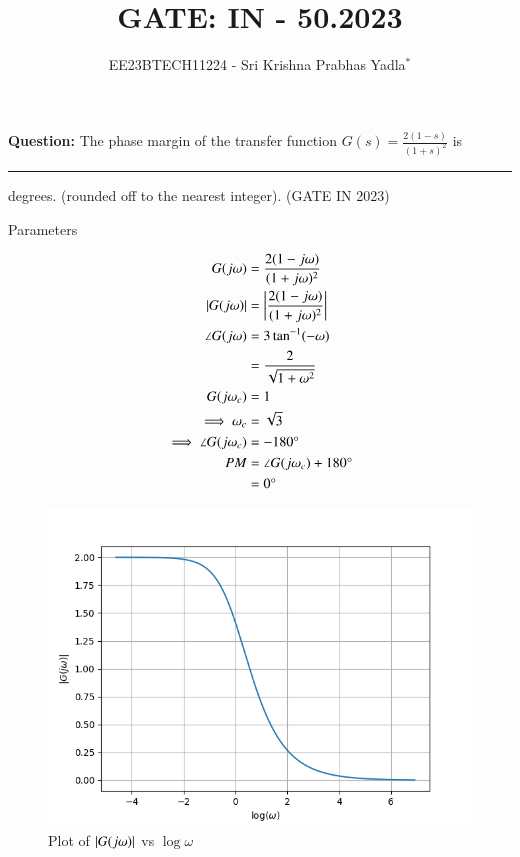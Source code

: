 \documentclass[journal,12pt,twocolumn]{IEEEtran}
\theoremstyle{remark}
\begin{document}

\vspace{3cm}

\title{GATE: IN - 50.2023}
\author{EE23BTECH11224 - Sri Krishna Prabhas Yadla$^{*}$%
}
\maketitle
\newpage
\bigskip

\renewcommand{\thefigure}{\arabic{figure}}
\renewcommand{\thetable}{\arabic{table}}


\vspace{3cm}
\textbf{Question:} The phase margin of the transfer function $G(s) = \frac{2(1-s)}{(1+s)^2}$ is \rule{1cm}{0.15mm} degrees. (rounded off to the nearest integer). \hfill (GATE IN 2023)\\
\solution
\begin{table}[htbp]
	\centering
	\def\arraystrech{1.5}
	
	\caption{Parameters}
	\label{tab:parameters}
\end{table}
\begin{align}
	G(j\omega) &= \frac{2(1-j\omega)}{(1+j\omega)^2} \\
	\left\vert G(j\omega)\right\vert &= \left\vert\frac{2(1-j\omega)}{(1+j\omega)^2}\right\vert \\
	\angle G(j\omega) &= 3\tan^{-1}(-\omega) \\
	&= \frac{2}{\sqrt{1+\omega^2}} \\
	G(j\omega_c) &= 1 \\ 
	\implies \omega_c &= \sqrt{3} \\
	\implies \angle G(j\omega_c)&= -180\degree \\
	PM &= \angle G(j\omega_c) + 180\degree \\
	&= 0\degree
\end{align}
\begin{figure}[htbp]
	\includegraphics[width=\columnwidth]{figs/magnitude.png}
	\caption{Plot of $\left\vert G(j\omega)\right\vert$ vs $\log{\omega}$}
	\label{fig:mag/w}
\end{figure}
\end{document}
